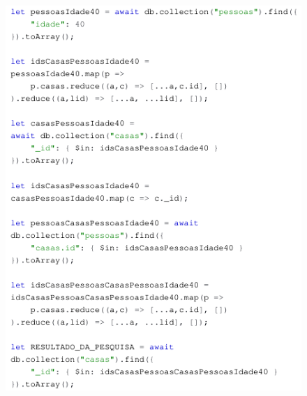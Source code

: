 \documentclass{beamer} %
\begin{document}
\begin{frame}
    \begin{figure}
        \centering
        \includegraphics[height=0.98\textheight]{imagens/query-manual.png}
        \label{fig:query-manual}
    \end{figure}
\end{frame}
\end{document}

